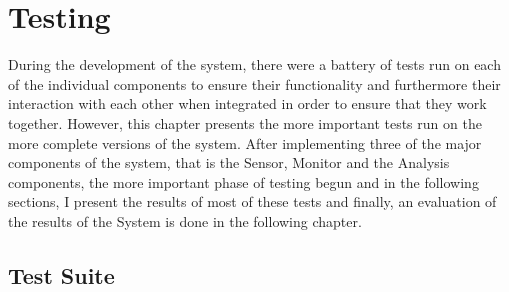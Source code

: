 \chapter{Testing}\label{ch:testing} %

During the development of the system, there were a battery of tests run on each of the individual components to ensure their functionality and furthermore their interaction with each other when integrated in order to ensure that they work together. However, this chapter presents the more important tests run on the more complete versions of the system. After implementing three of the major components of the system, that is the Sensor, Monitor and the Analysis components, the more important phase of testing begun and in the following sections, I present the results of most of these tests and finally, an evaluation of the results of the System is done in the following chapter.
\section{Test Suite}
